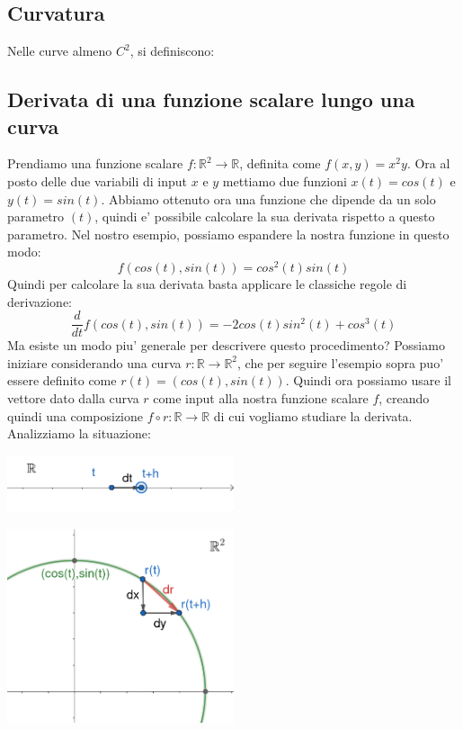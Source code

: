 \documentclass{report}
\begin{document}
\subsection{Curvatura}
Nelle curve almeno $ C^2 $, si definiscono:
\subsection{Derivata di una funzione scalare lungo una curva}
Prendiamo una funzione scalare $ f:\mathbb{R}^2\to\mathbb{R} $, definita come $ f(x,y) = x^2y $. Ora al posto delle due variabili di input $ x $ e $ y $ mettiamo due funzioni $ x(t)=cos(t) $ e $ y(t)=sin(t) $. Abbiamo ottenuto ora una funzione che dipende da un solo parametro $ (t) $, quindi e' possibile calcolare la sua derivata rispetto a questo parametro. Nel nostro esempio, possiamo espandere la nostra funzione in questo modo:
\[
  f(cos(t), sin(t)) = cos^2(t)sin(t)
\]
Quindi per calcolare la sua derivata basta applicare le classiche regole di derivazione:
\[
  \frac{d}{dt}f(cos(t), sin(t)) = -2cos(t)sin^2(t) + cos^3(t)
\]
Ma esiste un modo piu' generale per descrivere questo procedimento? Possiamo iniziare considerando una curva $ r:\mathbb{R}\to\mathbb{R}^2 $, che per seguire l'esempio sopra puo' essere definito come $ r(t) = (cos(t), sin(t)) $. Quindi ora possiamo usare il vettore dato dalla curva $ r $ come input alla nostra funzione scalare $ f $, creando quindi una composizione $ f \circ r: \mathbb{R}\to\mathbb{R} $ di cui vogliamo studiare la derivata. Analizziamo la situazione:
\begin{center}
  \includegraphics[width=0.5\textwidth]{img/2024-05-05-18-09-45.png}
\end{center}
\begin{center}
  \includegraphics[width=0.5\textwidth]{img/2024-05-05-18-18-30.png}
\end{center}
\end{document}
